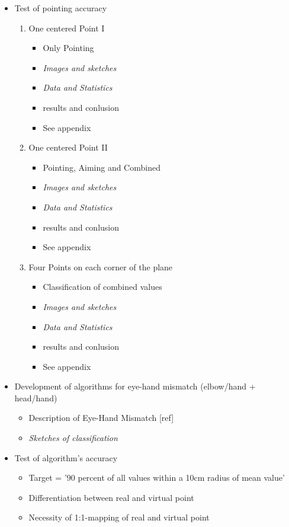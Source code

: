 \begin{itemize}
	\item Test of pointing accuracy
	\begin{enumerate}
		\item One centered Point I
		\begin{itemize}
			\item Only Pointing
			\item \textit{Images and sketches}
			\item \textit{Data and Statistics}
			\item results and conlusion
			\item See appendix
		\end{itemize}
		\item One centered Point II
		\begin{itemize}
			\item Pointing, Aiming and Combined
			\item \textit{Images and sketches}
			\item \textit{Data and Statistics}
			\item results and conlusion
			\item See appendix
		\end{itemize}
		\item Four Points on each corner of the plane
		\begin{itemize}
			\item Classification of combined values
			\item \textit{Images and sketches}
			\item \textit{Data and Statistics}
			\item results and conlusion
			\item See appendix
		\end{itemize}
	\end{enumerate}
	\item Development of algorithms for eye-hand mismatch (elbow/hand + head/hand)
	\begin{itemize}
		\item Description of Eye-Hand Mismatch [ref]
		\item \textit{Sketches of classification}
	\end{itemize}
	\item Test of algorithm's accuracy
	\begin{itemize}
		\item Target = '90 percent of all values within a 10cm radius of mean value'
		\item Differentiation between real and virtual point
		\item Necessity of 1:1-mapping of real and virtual point
	\end{itemize}
\end{itemize}
